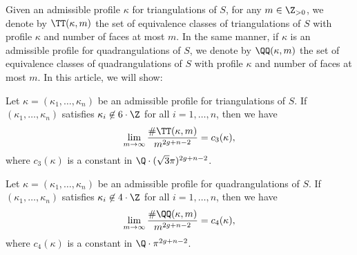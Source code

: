 Given an admissible profile $\kappa$ for triangulations of $S$, for any $m\in \Z_{>0}$, we denote by $\TT(\kappa,m)$ the set of equivalence classes of triangulations of $S$ with profile $\kappa$ and number of faces at most $m$. In the same manner, if $\kappa$ is an admissible profile for quadrangulations of $S$, we denote by $\QQ(\kappa,m)$ the set of equivalence classes of quadrangulations of $S$ with profile $\kappa$ and number of faces at most $m$.
In this article, we will show:

\skpt
\begin{Theorem}\label{th:asymp:count}
\begin{enumeratei}
\item\label{th:asymp:counti}
Let $\kappa=(\kappa_1,\dots,\kappa_n)$ be an admissible profile for triangulations of $S$. If $(\kappa_1,\dots,\kappa_n)$ satisfies $\kappa_i\not\in 6\cdot\Z$ for all $i=1,\dots,n$, then we have
\begin{equation}\label{eq:asymp:triang}
\lim_{m \to \infty} \frac{\#\TT(\kappa,m)}{m^{2g+n-2}}=c_3(\kappa),
\end{equation}
where $c_3(\kappa)$ is a constant in $\Q\cdot(\sqrt{3}\pi)^{2g+n-2}$.

\item\label{th:asymp:countii}
Let $\kappa=(\kappa_1,\dots,\kappa_n)$ be an admissible profile for quadrangulations of $S$. If $(\kappa_1,\dots,\kappa_n)$ satisfies $\kappa_i\not\in 4\cdot\Z$ for all $i=1,\dots,n$, then we have
\begin{equation}\label{eq:asymp:quad}
\lim_{m \to \infty} \frac{\#\QQ(\kappa,m)}{m^{2g+n-2}}=c_4(\kappa),
\end{equation}
where $c_4(\kappa)$ is a constant in $\Q\cdot\pi^{2g+n-2}$.
\end{enumeratei}
\end{Theorem}

